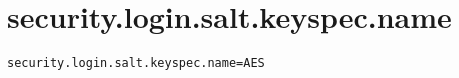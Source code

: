 \section{security.login.salt.keyspec.name}
\label{configuration:SecurityLoginSaltKeyspecName}
\ClearAPI
\TODO
{}
\begin{lstlisting}[style=Props,caption={Usage example for \textit{security.login.salt.keyspec.name}}]
security.login.salt.keyspec.name=AES
\end{lstlisting}